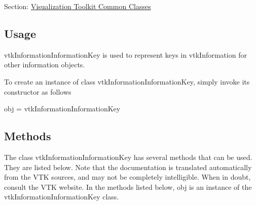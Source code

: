 Section\-: \hyperlink{sec_vtkcommon}{Visualization Toolkit Common Classes} \hypertarget{vtkwidgets_vtkxyplotwidget_Usage}{}\subsection{Usage}\label{vtkwidgets_vtkxyplotwidget_Usage}
vtk\-Information\-Information\-Key is used to represent keys in vtk\-Information for other information objects.

To create an instance of class vtk\-Information\-Information\-Key, simply invoke its constructor as follows \begin{DoxyVerb}  obj = vtkInformationInformationKey
\end{DoxyVerb}
 \hypertarget{vtkwidgets_vtkxyplotwidget_Methods}{}\subsection{Methods}\label{vtkwidgets_vtkxyplotwidget_Methods}
The class vtk\-Information\-Information\-Key has several methods that can be used. They are listed below. Note that the documentation is translated automatically from the V\-T\-K sources, and may not be completely intelligible. When in doubt, consult the V\-T\-K website. In the methods listed below, {\ttfamily obj} is an instance of the vtk\-Information\-Information\-Key class. 

